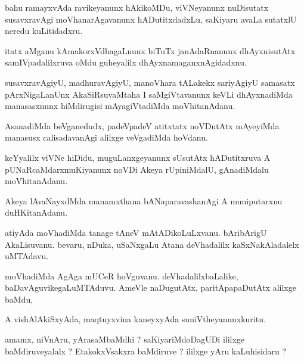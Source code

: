 \documentclass{article}
\begin{document}
\begin{mn}
bahu ramayxvAda ravikeyanunx hAkikoMDu, viVNeyanunx nuDisutatx susavxravAgi 
moVhanarAgavanunx hADutitxdadxLu,  saKiyaru avaLa sutatxlU neredu kuLitidadxru.
\end{mn}

\begin{mn}
itatx aMganu kAmakorxVdhagaLnunx biTuTx janAdaRnanunx  dhAyxnisutAtx 
samIVpadalilxruva oMdu guheyalilx dhAyxnamaganxnAgidadxnu.
\end{mn}

\begin{mn}
susavxravAgiyU, madhuravAgiyU, manoVhara  tALakekx sariyAgiyU samasatx pArxNigaLanUnx AkaSiRsuvaMtaha 
I saMgiVtavanunx keVLi dhAyxnadiMda manasasxnunx hiMdirugisi mAyagiVtadiMda moVhitanAdanu.
\end{mn}

\begin{mn}
AsanadiMda beVganedudx, padeVpadeV atitxtatx noVDutAtx mAyeyiMda manasusx calisadavanAgi alilxge veVgadiMda hoVdanu.
\end{mn}

\begin{mn}
keYyalilx viVNe hiDidu, muguLanxgeyanunx sUsutAtx hADutitxruva A pUNaRcaMdarxmuKiyanunx 
noVDi Akeya rUpiniMdalU, gAnadiMdalu moVhitanAdanu.
\end{mn}

\begin{mn}
Akeya lAvaNayxdMda manamxthana bANaparavashanAgi A muniputarxnu duHKitanAdanu. 
\end{mn}

\begin{mn}
atiyAda moVhadiMda tanage tAneV mAtADikoLuLxvanu. bAribArigU AkaLisuvanu. 
bevaru, nDuka, uSaNxgaLu Atana deVhadalilx kaSxNakAladalelx uMTAdavu.
\end{mn}

\begin{mn}
moVhadiMda AgAga mUCeR hoVguvanu. deVhadalilxbaLalike, baDavAguvikegaLuMTAduvu.  
AmeVle naDugutAtx,  paritApapaDutAtx alilxge baMdu, 
\end{mn}

\begin{mn}
A vishAlAkiSxyAda, maqtuyxvina kaneyxyAda suniVtheyanunxkuritu.
\end{mn}

\begin{mn}
amamx, niVnAru, yArasaMbaMdhi ?  saKiyariMdoDagUDi ililxge baMdiruveyalalx ?  
EtakokxVsakxra baMdiruve ?  ililxge yAru kaLuhisidaru ?
\end{mn}
\end{document}
